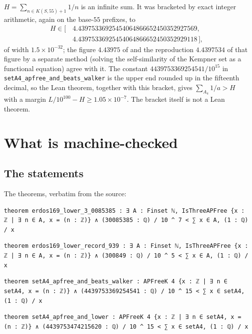 \documentclass[11pt,a4paper]{article}
\theoremstyle{definition}
\theoremstyle{remark}
\newcommand{\code}[1]{\texttt{#1}}
\begin{document}
$H = \sum_{n \in K(S,55)+1} 1/n$ is an infinite sum. It was bracketed by exact integer arithmetic, again on the base-$55$ prefixes, to
\[
\begin{aligned}
H \in [\,&4.43975336925454064866652450352927569,\\ &4.43975336925454064866652450352929118\,],
\end{aligned}
\]
of width $1.5 \times 10^{-32}$; the figure $4.43975$ of \cite{Wa25} and the reproduction $4.4397534$ of that figure by a separate method (solving the self-similarity of the Kempner set as a functional equation) agree with it. The constant $4439753369254541/10^{15}$ in \code{setA4\_\allowbreak{}apfree\_\allowbreak{}and\_\allowbreak{}beats\_\allowbreak{}walker} is the upper end rounded up in the fifteenth decimal, so the Lean theorem, together with this bracket, gives $\sum_{A_4} 1/a > H$ with a margin $L/10^{100} - H \ge 1.05 \times 10^{-7}$. The bracket itself is not a Lean theorem.

\section{What is machine-checked}\label{sec:lean}

\subsection{The statements}\label{sec:statements}

The theorems, verbatim from the source:

\begin{leancode}
\item \code{theorem erdos169\_\allowbreak{}lower\_\allowbreak{}3\_\allowbreak{}0085385 :\ ∃ A : Finset ℕ, IsThreeAPFree \{x : ℤ | ∃ n ∈ A, x = (n : ℤ)\} ∧ (30085385 : ℚ) / 10 \textasciicircum{} 7 < ∑ x ∈ A, (1 : ℚ) / x}
\item \code{theorem erdos169\_\allowbreak{}lower\_\allowbreak{}record\_\allowbreak{}939 :\ ∃ A : Finset ℕ, IsThreeAPFree \{x : ℤ | ∃ n ∈ A, x = (n : ℤ)\} ∧ (300849 : ℚ) / 10 \textasciicircum{} 5 < ∑ x ∈ A, (1 : ℚ) / x}
\item \code{theorem setA4\_\allowbreak{}apfree\_\allowbreak{}and\_\allowbreak{}beats\_\allowbreak{}walker :\ APFreeK 4 \{x : ℤ | ∃ n ∈ setA4, x = (n : ℤ)\} ∧ (4439753369254541 : ℚ) / 10 \textasciicircum{} 15 < ∑ x ∈ setA4, (1 : ℚ) / x}
\item \code{theorem setA4\_\allowbreak{}apfree\_\allowbreak{}and\_\allowbreak{}lower :\ APFreeK 4 \{x : ℤ | ∃ n ∈ setA4, x = (n : ℤ)\} ∧ (4439753474215620 : ℚ) / 10 \textasciicircum{} 15 < ∑ x ∈ setA4, (1 : ℚ) / x}
\end{leancode}
\end{document}
